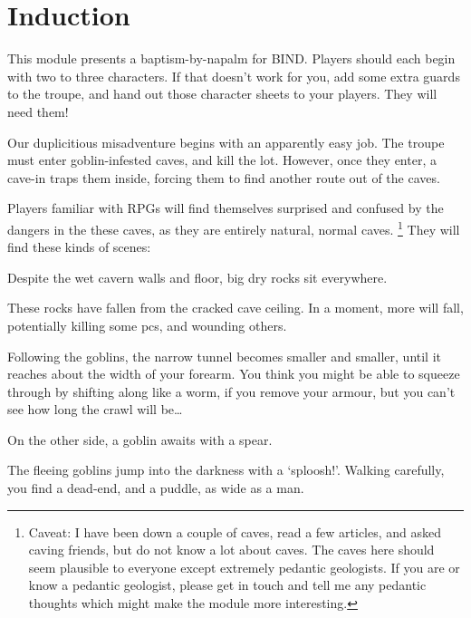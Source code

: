 \section{Induction}
\begin{multicols}{2}

\noindent
This module presents a baptism-by-napalm for BIND.
Players should each begin with two to three characters.
If that doesn't work for you, add some extra \glspl{guard} to the troupe, and hand out those character sheets to your players.
They will need them!

Our duplicitious misadventure begins with an apparently easy job.
The troupe must enter goblin-infested caves, and kill the lot.
However, once they enter, a cave-in traps them inside, forcing them to find another route out of the caves.

Players familiar with RPGs will find themselves surprised and confused by the dangers in the these caves, as they are entirely natural, normal caves.%
\footnote{Caveat: I have been down a couple of caves, read a few articles, and asked caving friends, but do not know a lot about caves.
The caves here should seem plausible to everyone except extremely pedantic geologists.
If you are or know a pedantic geologist, please get in touch and tell me any pedantic thoughts which might make the module more interesting.}
They will find these kinds of scenes:


\begin{boxtext}
  Despite the wet cavern walls and floor, big dry rocks sit everywhere.
\end{boxtext}

\noindent
These rocks have fallen from the cracked cave ceiling.
In a moment, more will fall, potentially killing some \glspl{pc}, and wounding others.

\begin{boxtext}
  Following the goblins, the narrow tunnel becomes smaller and smaller, until it reaches about the width of your forearm.
  You think you might be able to squeeze through by shifting along like a worm, if you remove your armour, but you can't see how long the crawl will be\ldots
\end{boxtext}

\noindent
On the other side, a goblin awaits with a spear.

\begin{boxtext}
  The fleeing goblins jump into the darkness with a `sploosh!'.
  Walking carefully, you find a dead-end, and a puddle, as wide as a man.
\end{boxtext}


\end{multicols}
